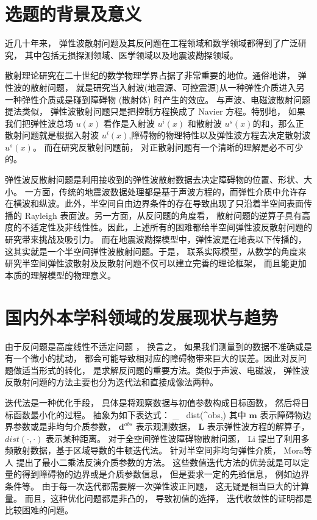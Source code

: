 \section{选题的背景及意义}
近几十年来， 弹性波散射问题及其反问题在工程领域和数学领域都得到了广泛研究\cite{landau}， 其中包括无损探测领域、医学领域以及地震波勘探领域。

散射理论研究在二十世纪的数学物理学界占据了非常重要的地位。通俗地讲， 弹性波的散射问题， 就是研究当入射波(地震源、可控震源)从一种弹性介质进入另一种弹性介质或是碰到障碍物 (散射体) 时产生的效应。 与声波、电磁波散射问题提法类似， 弹性波散射问题只是把控制方程换成了 Navier 方程。特别地， 如果我们把弹性波总场 $u(x)$ 看作是入射波 $u^i(x)$ 和散射波 $u^s(x)$的和，那么正散射问题就是根据入射波 $u^i(x)$,障碍物的物理特性以及弹性波方程去决定散射波 $u^s(x)$。 而在研究反散射问题前， 对正散射问题有一个清晰的理解是必不可少的。

弹性波反散射问题是利用接收到的弹性波散射数据去决定障碍物的位置、形状、大小。 一方面，传统的地震波数据处理都是基于声波方程的，而弹性介质中允许存在横波和纵波。此外，半空间自由边界条件的存在导致出现了只沿着半空间表面传播的 Rayleigh 表面波。另一方面，从反问题的角度看， 散射问题的逆算子具有高度的不适定性及非线性性。因此，上述所有的困难都给半空间弹性波反散射问题的研究带来挑战及吸引力。 而在地震波勘探模型中，弹性波是在地表以下传播的，这其实就是一个半空间弹性波散射问题。于是， 联系实际模型，从数学的角度来研究半空间弹性波散射及反散射问题不仅可以建立完善的理论框架， 而且能更加本质的理解模型的物理意义。


\section{国内外本学科领域的发展现状与趋势}
由于反问题是高度线性不适定问题 \cite{hadamard1923lectures}， 换言之， 如果我们测量到的数据不准确或是有一个微小的扰动， 都会可能导致相对应的障碍物带来巨大的误差。因此对反问题做适当形式的转化， 是求解反问题的重要方法。类似于声波、电磁波， 弹性波反散射问题的方法主要也分为迭代法和直接成像法两种。 

迭代法是一种优化手段， 具体是将观察数据与初值参数构成目标函数， 然后将目标函数最小化的过程。 抽象为如下表达式：
\ben
\min_{} \ dist(^{obs},)
\een
其中 $\mathbf m$ 表示障碍物边界参数或是非均匀介质参数， $\mathbf{d}^{obs}$ 表示观测数据， $\mathbf{{L}}$ 表示弹性波方程的解算子， $dist(\cdot,\cdot)$ 表示某种距离。
对于全空间弹性波障碍物散射问题， Li \cite{li2016inverse} 提出了利用多频散射数据，基于区域导数的牛顿迭代法。 针对半空间非均匀弹性介质， Mora等人 \cite{mora1987nonlinear} 提出了最小二乘法反演介质参数的方法。 这些数值迭代方法的优势就是可以定量的得到障碍物的边界或是介质参数信息， 但是要求一定的先验信息， 例如边界条件等。 由于每一次迭代都需要解一次弹性波正问题， 这无疑是相当巨大的计算量。 而且，这种优化问题都是非凸的， 导致初值的选择， 迭代收敛性的证明都是比较困难的问题。 

